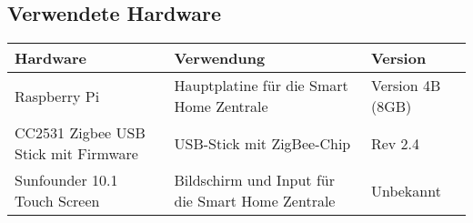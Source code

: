 \subsection{Verwendete Hardware}\label{qu_hardware}
\begin{tabularx}{\textwidth}{|p{5cm}|p{6cm}|p{3.2cm}|}
 	\hline
 	\textbf{Hardware} & \textbf{Verwendung} & \textbf{Version} \\
 	\hline
 	Raspberry Pi & Hauptplatine für die Smart Home Zentrale & Version 4B (8GB)\\
 	\hline
 	CC2531 Zigbee USB Stick mit Firmware & USB-Stick mit ZigBee-Chip & Rev 2.4\\
 	\hline
 	Sunfounder 10.1 Touch Screen  & Bildschirm und Input für die Smart Home Zentrale & Unbekannt\\
 	 \hline
\end{tabularx}
